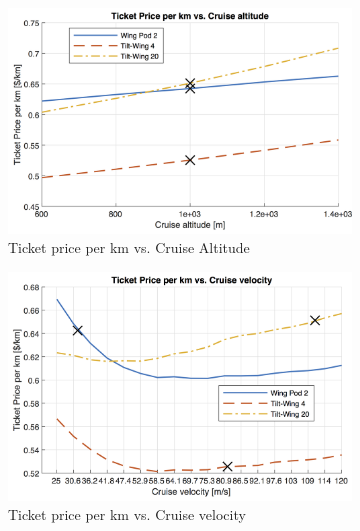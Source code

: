 \begin{figure}[h]
\begin{subfigure}[t]{0.33\textwidth}
    \centering
    \includegraphics[width=\textwidth]{Figures/Alt_TPrice_perkmNOPAD.png}
    \captionsetup{justification=centering}
    \caption{Ticket price per km vs. Cruise Altitude}
    \label{fig:sens3} %
\end{subfigure}
\begin{subfigure}[t]{0.33\textwidth}
    \centering
    \includegraphics[width=\textwidth]{Figures/Cruise_TPrice_perkmNOPAD.png}
    \captionsetup{justification=centering}
    \caption{Ticket price per km vs. Cruise velocity}
    \label{fig:sens8}
\end{subfigure}
\begin{subfigure}[t]{0.33\textwidth}
    \centering

\end{subfigure}
\end{figure}

